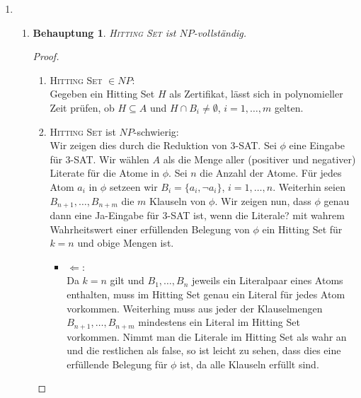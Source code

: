 \documentclass[a4paper]{scrartcl}
\newtheorem*{proposition}{Behauptung}
\begin{document}
\begin{enumerate}[label=\bfseries \arabic*.]
\begin{enumerate}
\end{enumerate}

\item %
\begin{enumerate}
    \item
        \begin{proposition}
            \textsc{Hitting Set} ist $NP$-vollständig.
        \end{proposition}
        \begin{proof}
            \hfill \\
            \begin{enumerate}
                \item \textsc{Hitting Set} $\in NP$: \\
                    Gegeben ein Hitting Set $H$ als Zertifikat, lässt sich in
                    polynomieller Zeit prüfen, ob $H \subseteq A$ und $H \cap
                    B_i \neq \emptyset$, $i = 1, \dotsc, m$ gelten.

                \item \textsc{Hitting Set} ist $NP$-schwierig: \\
                    Wir zeigen dies durch die Reduktion von 3-SAT.
                    Sei $\phi$ eine Eingabe für 3-SAT. Wir wählen $A$ als die
                    Menge aller (positiver und negativer) Literate für die
                    Atome in $\phi$.
                    Sei $n$ die Anzahl der Atome. Für jedes Atom $a_i$ in
                    $\phi$ setzeen wir $B_i = \{a_i, \lnot a_i\}$, $i = 1,
                    \dotsc, n$. Weiterhin seien $B_{n+1}, \dotsc, B_{n+m}$ die
                    $m$ Klauseln von $\phi$. Wir zeigen nun, dass $\phi$ genau
                    dann eine Ja-Eingabe für 3-SAT ist, wenn die Literale? mit
                    wahrem Wahrheitswert einer erfüllenden Belegung von $\phi$
                    ein Hitting Set für $k = n$ und obige Mengen ist.
                    \begin{itemize}
                        \item $\Leftarrow$: \\
                            Da $k = n$ gilt und $B_1, \dotsc, B_n$ jeweils ein
                            Literalpaar eines Atoms enthalten, muss im Hitting
                            Set genau ein Literal für jedes Atom vorkommen.
                            Weiterhing muss aus jeder der Klauselmengen
                            $B_{n+1}, \dotsc, B_{n+m}$ mindestens ein Literal
                            im Hitting Set vorkommen. Nimmt man die Literale im
                            Hitting Set als wahr an und die restlichen als
                            false, so ist leicht zu sehen, dass dies eine
                            erfüllende Belegung für $\phi$ ist, da alle
                            Klauseln erfüllt sind.


\end{itemize}
\end{enumerate}
\end{proof}
\end{enumerate}
\end{enumerate}
\end{document}
